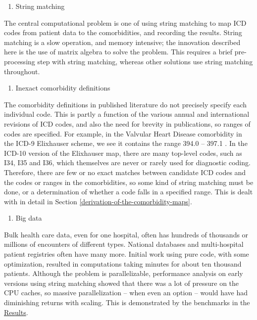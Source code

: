 \documentclass[article]{jss}
\providecommand{\tightlist}{%
  \setlength{\itemsep}{0pt}\setlength{\parskip}{0pt}}
\begin{document}
\begin{enumerate}
\def\labelenumi{\arabic{enumi}.}
\tightlist
\item
  String matching
\end{enumerate}

The central computational problem is one of using string matching to map
ICD codes from patient data to the comorbidities, and recording the
results. String matching is a slow operation, and memory intensive; the
innovation described here is the use of matrix algebra to solve the
problem. This requires a brief pre-processing step with string matching,
whereas other solutions use string matching throughout.

\begin{enumerate}
\def\labelenumi{\arabic{enumi}.}
\setcounter{enumi}{1}
\tightlist
\item
  Inexact comorbidity definitions
\end{enumerate}

The comorbidity definitions in published literature do not precisely
specify each individual code. This is partly a function of the various
annual and international revisions of ICD codes, and also the need for
brevity in publications, so ranges of codes are specified. For example,
in the Valvular Heart Disease comorbidity in the ICD-9 Elixhauser
scheme, we see it contains the range 394.0 -- 397.1 . In the ICD-10
version of the Elixhauser map, there are many top-level codes, such as
I34, I35 and I36, which themselves are never or rarely used for
diagnostic coding. Therefore, there are few or no exact matches between
candidate ICD codes and the codes or ranges in the comorbidities, so
some kind of string matching must be done, or a determination of whether
a code falls in a specified range. This is dealt with in detail in
Section \ref{derivation-of-the-comorbidity-maps}.

\begin{enumerate}
\def\labelenumi{\arabic{enumi}.}
\setcounter{enumi}{2}
\tightlist
\item
  Big data
\end{enumerate}

Bulk health care data, even for one hospital, often has hundreds of
thousands or millions of encounters of different types. National
databases and multi-hospital patient registries often have many more.
Initial work using pure  code, with some optimization,
resulted in computations taking minutes for about ten thousand patients.
Although the problem is parallelizable, performance analysis on early
versions using string matching showed that there was a lot of pressure
on the CPU caches, so massive parallelization -- when even an option --
would have had diminishing returns with scaling. This is demonstrated by
the benchmarks in the \protect\hyperlink{results}{Results}.
\end{document}
